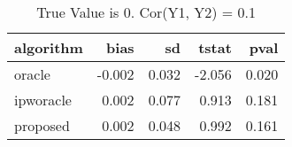 \begin{table}[h!]
\caption{True Value is 0. Cor(Y1, Y2) = 0.1}
\centering
\begin{tabular}[t]{lrrrr}
\toprule
algorithm & bias & sd & tstat & pval\\
\midrule
oracle & -0.002 & 0.032 & -2.056 & 0.020\\
ipworacle & 0.002 & 0.077 & 0.913 & 0.181\\
proposed & 0.002 & 0.048 & 0.992 & 0.161\\
\bottomrule
\end{tabular}
\end{table}

